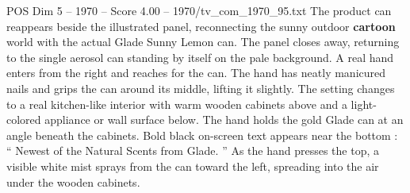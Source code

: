 \begin{textsample}{POS Dim 5 – 1970 – Score 4.00 – 1970/tv\_com\_1970\_95.txt}
The product can reappears beside the illustrated panel, reconnecting the sunny outdoor \textbf{cartoon} world with the actual Glade Sunny Lemon can.
The panel closes away, returning to the single aerosol can standing by itself on the pale background.
A real hand enters from the right and reaches for the can.
The hand has neatly manicured nails and grips the can around its middle, lifting it slightly.
The setting changes to a real kitchen-like interior with warm wooden cabinets above and a light-colored appliance or wall surface below.
The hand holds the gold Glade can at an angle beneath the cabinets.
Bold black on-screen text appears near the bottom : “ Newest of the Natural Scents from Glade. ” As the hand presses the top, a visible white mist sprays from the can toward the left, spreading into the air under the wooden cabinets.

\end{textsample}
